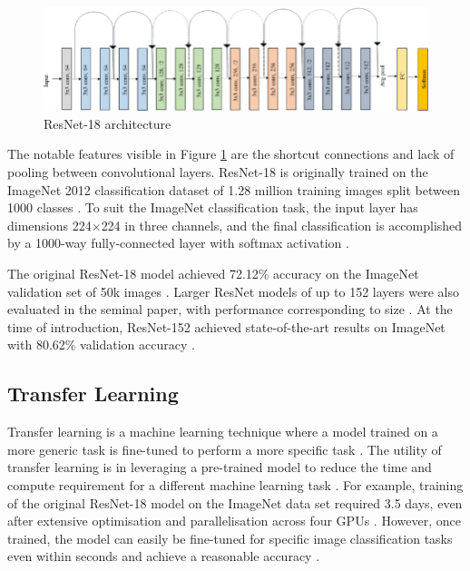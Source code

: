 \begin{figure}[ht]
  \centering
  \includegraphics[width=\textwidth]{images/q2_resnet18.png}
  \caption{ResNet-18 architecture \cite{ramzan_2019}}
  \label{fig:resnet18}
\end{figure}

The notable features visible in Figure \ref{fig:resnet18} are the shortcut connections and lack of pooling between convolutional layers. ResNet-18 is originally trained on the ImageNet 2012 classification dataset \cite{russakovsky_2015} of 1.28 million training images split between 1000 classes \cite{he_2016}. To suit the ImageNet classification task, the input layer has dimensions 224$\times$224 in three channels, and the final classification is accomplished by a 1000-way fully-connected layer with softmax activation \cite{he_2016}.

The original ResNet-18 model achieved 72.12\% accuracy on the ImageNet validation set of 50k images \cite{he_2016}. Larger ResNet models of up to 152 layers were also evaluated in the seminal paper, with performance corresponding to size \cite{he_2016}. At the time of introduction, ResNet-152 achieved state-of-the-art results on ImageNet with 80.62\% validation accuracy \cite{he_2016}.

\subsection{Transfer Learning}

Transfer learning is a machine learning technique where a model trained on a more generic task is fine-tuned to perform a more specific task \cite{brownlee_2019}. The utility of transfer learning is in leveraging a pre-trained model to reduce the time and compute requirement for a different machine learning task \cite{brownlee_2019}. For example, training of the original ResNet-18 model on the ImageNet data set required 3.5 days, even after extensive optimisation and parallelisation across four GPUs \cite{gross_2016}. However, once trained, the model can easily be fine-tuned for specific image classification tasks even within seconds and achieve a reasonable accuracy \cite{howard_2020}.

